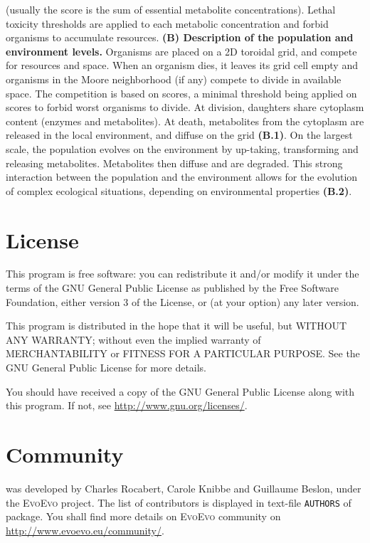 \begin{figurehere}
{{(usually the score is the sum of essential metabolite concentrations). Lethal toxicity thresholds are applied to each metabolic concentration and forbid organisms to accumulate resources. \textbf{(B) Description of the population and environment levels.} Organisms are placed on a 2D toroidal grid, and compete for resources and space. When an organism dies, it leaves its grid cell empty and organisms in the Moore neighborhood (if any) compete to divide in available space. The competition is based on scores, a minimal threshold being applied on scores to forbid worst organisms to divide. At division, daughters share cytoplasm content (enzymes and metabolites). At death, metabolites from the cytoplasm are released in the local environment, and diffuse on the grid \textbf{(B.1)}. On the largest scale, the population evolves on the environment by up-taking, transforming and releasing metabolites. Metabolites then diffuse and are degraded. This strong interaction between the population and the environment allows for the evolution of complex ecological situations, depending on environmental properties \textbf{(B.2)}.}}
\label{general_algorithm}
\end{figurehere}

\section{License}

This program is free software: you can redistribute it and/or modify it under the terms of the GNU General Public License as published by the Free Software Foundation, either version 3 of the License, or (at your option) any later version.

This program is distributed in the hope that it will be useful, but WITHOUT ANY WARRANTY; without even the implied warranty of MERCHANTABILITY or FITNESS FOR A PARTICULAR PURPOSE. See the GNU General Public License for more details.

You should have received a copy of the GNU General Public License along with this program. If not, see \href{http://www.gnu.org/licenses/}{http://www.gnu.org/licenses/}.

\section{Community}
{\packageName} was developed by Charles Rocabert, Carole Knibbe and Guillaume Beslon, under the \textsc{EvoEvo} project. The list of contributors is displayed in text-file \texttt{AUTHORS} of {\packageName}  package.
You shall find more details on \textsc{EvoEvo} community on \href{http://www.evoevo.eu/community/}{http://www.evoevo.eu/community/}.

